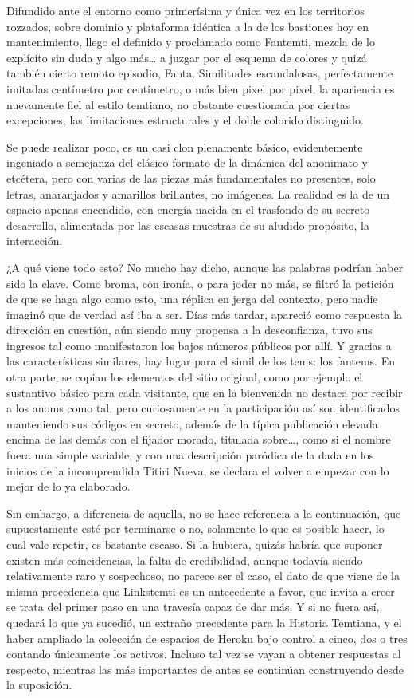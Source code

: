 \documentclass[
]{book}
\begin{document}
Difundido ante el entorno como primerísima y única vez en los territorios rozzados, sobre dominio y plataforma idéntica a la de los bastiones hoy en mantenimiento, llego el definido y proclamado como Fantemti, mezcla de lo explícito sin duda y algo más\ldots{} a juzgar por el esquema de colores y quizá también cierto remoto episodio, Fanta. Similitudes escandalosas, perfectamente imitadas centímetro por centímetro, o más bien pixel por pixel, la apariencia es nuevamente fiel al estilo temtiano, no obstante cuestionada por ciertas excepciones, las limitaciones estructurales y el doble colorido distinguido.

Se puede realizar poco, es un casi clon plenamente básico, evidentemente ingeniado a semejanza del clásico formato de la dinámica del anonimato y etcétera, pero con varias de las piezas más fundamentales no presentes, solo letras, anaranjados y amarillos brillantes, no imágenes. La realidad es la de un espacio apenas encendido, con energía nacida en el trasfondo de su secreto desarrollo, alimentada por las escasas muestras de su aludido propósito, la interacción.

¿A qué viene todo esto? No mucho hay dicho, aunque las palabras podrían haber sido la clave. Como broma, con ironía, o para joder no más, se filtró la petición de que se haga algo como esto, una réplica en jerga del contexto, pero nadie imaginó que de verdad así iba a ser. Días más tardar, apareció como respuesta la dirección en cuestión, aún siendo muy propensa a la desconfianza, tuvo sus ingresos tal como manifestaron los bajos números públicos por allí. Y gracias a las características similares, hay lugar para el simil de los tems: los fantems. En otra parte, se copian los elementos del sitio original, como por ejemplo el sustantivo básico para cada visitante, que en la bienvenida no destaca por recibir a los anoms como tal, pero curiosamente en la participación así son identificados manteniendo sus códigos en secreto, además de la típica publicación elevada encima de las demás con el fijador morado, titulada sobre\ldots, como si el nombre fuera una simple variable, y con una descripción paródica de la dada en los inicios de la incomprendida Titiri Nueva, se declara el volver a empezar con lo mejor de lo ya elaborado.

Sin embargo, a diferencia de aquella, no se hace referencia a la continuación, que supuestamente esté por terminarse o no, solamente lo que es posible hacer, lo cual vale repetir, es bastante escaso. Si la hubiera, quizás habría que suponer existen más coincidencias, la falta de credibilidad, aunque todavía siendo relativamente raro y sospechoso, no parece ser el caso, el dato de que viene de la misma procedencia que Linkstemti es un antecedente a favor, que invita a creer se trata del primer paso en una travesía capaz de dar más. Y si no fuera así, quedará lo que ya sucedió, un extraño precedente para la Historia Temtiana, y el haber ampliado la colección de espacios de Heroku bajo control a cinco, dos o tres contando únicamente los activos. Incluso tal vez se vayan a obtener respuestas al respecto, mientras las más importantes de antes se continúan construyendo desde la suposición.
\end{document}
